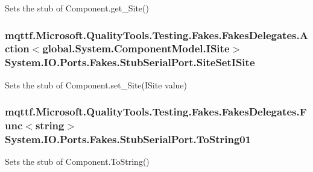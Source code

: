 Sets the stub of Component.\-get\-\_\-\-Site()

\hypertarget{class_system_1_1_i_o_1_1_ports_1_1_fakes_1_1_stub_serial_port_a391bdd7d31669cce311d8aaf879bd8d8}{
\subsubsection[{Site\-Set\-I\-Site}]{\setlength{\rightskip}{0pt plus 5cm}mqttf.\-Microsoft.\-Quality\-Tools.\-Testing.\-Fakes.\-Fakes\-Delegates.\-Action$<$global.\-System.\-Component\-Model.\-I\-Site$>$ System.\-I\-O.\-Ports.\-Fakes.\-Stub\-Serial\-Port.\-Site\-Set\-I\-Site}}\label{class_system_1_1_i_o_1_1_ports_1_1_fakes_1_1_stub_serial_port_a391bdd7d31669cce311d8aaf879bd8d8}


Sets the stub of Component.\-set\-\_\-\-Site(\-I\-Site value)

\hypertarget{class_system_1_1_i_o_1_1_ports_1_1_fakes_1_1_stub_serial_port_a75fc12388c98f17d84e83bc8d7037800}{
\subsubsection[{To\-String01}]{\setlength{\rightskip}{0pt plus 5cm}mqttf.\-Microsoft.\-Quality\-Tools.\-Testing.\-Fakes.\-Fakes\-Delegates.\-Func$<$string$>$ System.\-I\-O.\-Ports.\-Fakes.\-Stub\-Serial\-Port.\-To\-String01}}\label{class_system_1_1_i_o_1_1_ports_1_1_fakes_1_1_stub_serial_port_a75fc12388c98f17d84e83bc8d7037800}


Sets the stub of Component.\-To\-String()



